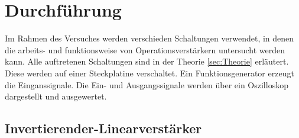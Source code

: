 \section{Durchführung}
\label{sec:Durchführung}

Im Rahmen des Versuches werden verschieden Schaltungen verwendet, in denen die arbeits- und funktionsweise von Operationsverstärkern untersucht werden kann.
Alle auftretenen Schaltungen sind in der Theorie \ref{sec:Theorie} erläutert.
Diese werden auf einer Steckplatine verschaltet.
Ein Funktionsgenerator erzeugt die Einganssignale.
Die Ein- und Ausgangssignale werden über ein Oszilloskop dargestellt und ausgewertet. 




\subsection{Invertierender-Linearverstärker}

